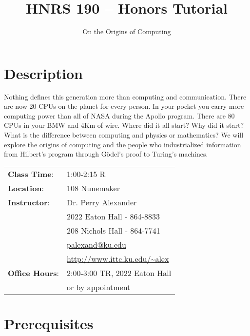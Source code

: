\documentclass{tufte-handout}
\title{HNRS 190 -- Honors Tutorial}
\author{On the Origins of Computing}
\begin{document}
\maketitle


\section{Description}
\noindent Nothing defines this generation more than computing and
communication.  There are now 20 CPUs on the planet for every person.
In your pocket you carry more computing power than all of NASA during
the Apollo program.  There are 80 CPUs in your BMW and 4Km of wire.
Where did it all start?  Why did it start?  What is the difference
between computing and physics or mathematics?  We will explore the
origins of computing and the people who industrialized information
from Hilbert's program through G\"{o}del's proof to Turing's
machines.


\begin{margintable}
\begin{tabular}{ll}
  \textbf{Class Time}: & 1:00-2:15 R \\
  \textbf{Location}: & 108 Nunemaker \\
  \textbf{Instructor}: & Dr. Perry Alexander \\
  & 2022 Eaton Hall - 864-8833 \\
  & 208 Nichols Hall - 864-7741 \\
  & \url{palexand@ku.edu} \\
  & \url{http://www.ittc.ku.edu/~alex} \\
  \textbf{Office Hours}: & 2:00-3:00 TR, 2022 Eaton Hall \\
  & or by appointment \\
\end{tabular}
\end{margintable}

\section{Prerequisites}
\end{document}
